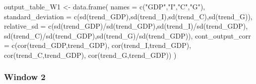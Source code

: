\documentclass[
]{article}
\newenvironment{Shaded}{\begin{snugshade}}{\end{snugshade}}
\newcommand{\AttributeTok}[1]{\textcolor[rgb]{0.77,0.63,0.00}{#1}}
\newcommand{\FunctionTok}[1]{\textcolor[rgb]{0.00,0.00,0.00}{#1}}
\newcommand{\NormalTok}[1]{#1}
\newcommand{\OtherTok}[1]{\textcolor[rgb]{0.56,0.35,0.01}{#1}}
\newcommand{\SpecialCharTok}[1]{\textcolor[rgb]{0.00,0.00,0.00}{#1}}
\newcommand{\StringTok}[1]{\textcolor[rgb]{0.31,0.60,0.02}{#1}}
\begin{document}
\begin{Shaded}
\begin{Highlighting}[]
\NormalTok{output\_table\_W1 }\OtherTok{\textless{}{-}} \FunctionTok{data.frame}\NormalTok{(}
  \AttributeTok{names =} \FunctionTok{c}\NormalTok{(}\StringTok{"GDP"}\NormalTok{,}\StringTok{"I"}\NormalTok{,}\StringTok{"C"}\NormalTok{,}\StringTok{"G"}\NormalTok{),}
  \AttributeTok{standard\_deviation =} \FunctionTok{c}\NormalTok{(}\FunctionTok{sd}\NormalTok{(trend\_GDP),}\FunctionTok{sd}\NormalTok{(trend\_I),}\FunctionTok{sd}\NormalTok{(trend\_C),}\FunctionTok{sd}\NormalTok{(trend\_G)),}
  \AttributeTok{relative\_sd =} \FunctionTok{c}\NormalTok{(}\FunctionTok{sd}\NormalTok{(trend\_GDP)}\SpecialCharTok{/}\FunctionTok{sd}\NormalTok{(trend\_GDP),}\FunctionTok{sd}\NormalTok{(trend\_I)}\SpecialCharTok{/}\FunctionTok{sd}\NormalTok{(trend\_GDP), }\FunctionTok{sd}\NormalTok{(trend\_C)}\SpecialCharTok{/}\FunctionTok{sd}\NormalTok{(trend\_GDP),}\FunctionTok{sd}\NormalTok{(trend\_G)}\SpecialCharTok{/}\FunctionTok{sd}\NormalTok{(trend\_GDP)),}
  \AttributeTok{cont\_output\_corr =} \FunctionTok{c}\NormalTok{(}\FunctionTok{cor}\NormalTok{(trend\_GDP,trend\_GDP), }\FunctionTok{cor}\NormalTok{(trend\_I,trend\_GDP), }\FunctionTok{cor}\NormalTok{(trend\_C,trend\_GDP), }\FunctionTok{cor}\NormalTok{(trend\_G,trend\_GDP))}
\NormalTok{  )}
\end{Highlighting}
\end{Shaded}

\hypertarget{window-2}{%
\subsubsection{Window 2}\label{window-2}}
\end{document}
